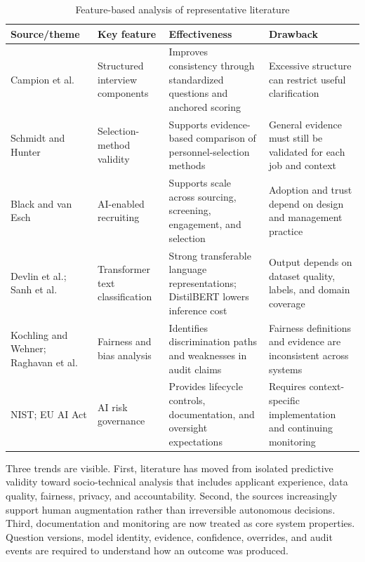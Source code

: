 \documentclass[12pt,a4paper,oneside]{report}
\renewcommand{\cite}[1]{}
\begin{document}
\begin{table}[htbp]
\centering
\caption{Feature-based analysis of representative literature}
\label{tab:bibliometric}
\fontsize{9.5}{11.5}\selectfont
\begin{tabularx}{\textwidth}{>{\raggedright\arraybackslash}p{2.25cm}
>{\raggedright\arraybackslash}p{2.45cm}
>{\raggedright\arraybackslash}X
>{\raggedright\arraybackslash}X}
\toprule
\textbf{Source/theme} & \textbf{Key feature} & \textbf{Effectiveness} & \textbf{Drawback} \\
\midrule
Campion et al. \cite{campion1997} & Structured interview components & Improves consistency through standardized questions and anchored scoring & Excessive structure can restrict useful clarification \\
\addlinespace
Schmidt and Hunter \cite{schmidt1998} & Selection-method validity & Supports evidence-based comparison of personnel-selection methods & General evidence must still be validated for each job and context \\
\addlinespace
Black and van Esch \cite{black2020} & AI-enabled recruiting & Supports scale across sourcing, screening, engagement, and selection & Adoption and trust depend on design and management practice \\
\addlinespace
Devlin et al.; Sanh et al. \cite{devlin2019,sanh2019} & Transformer text classification & Strong transferable language representations; DistilBERT lowers inference cost & Output depends on dataset quality, labels, and domain coverage \\
\addlinespace
Kochling and Wehner; Raghavan et al. \cite{kochling2020,raghavan2020} & Fairness and bias analysis & Identifies discrimination paths and weaknesses in audit claims & Fairness definitions and evidence are inconsistent across systems \\
\addlinespace
NIST; EU AI Act \cite{nist2023,eu2024} & AI risk governance & Provides lifecycle controls, documentation, and oversight expectations & Requires context-specific implementation and continuing monitoring \\
\bottomrule
\end{tabularx}
\end{table}

Three trends are visible. First, literature has moved from isolated predictive validity
toward socio-technical analysis that includes applicant experience, data quality,
fairness, privacy, and accountability. Second, the sources increasingly support human
augmentation rather than irreversible autonomous decisions. Third, documentation and
monitoring are now treated as core system properties. Question versions, model
identity, evidence, confidence, overrides, and audit events are required to understand
how an outcome was produced.
\end{document}
